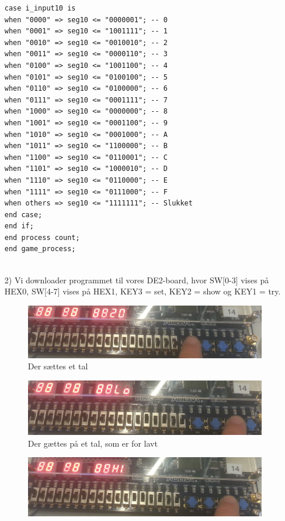 \begin{enumerate}
\begin{lstlisting}[caption={Behavioral style kode for Guessgame},label={lst:Guessgame}]
case i_input10 is
when "0000" => seg10 <= "0000001"; -- 0
when "0001" => seg10 <= "1001111"; -- 1
when "0010" => seg10 <= "0010010"; -- 2
when "0011" => seg10 <= "0000110"; -- 3
when "0100" => seg10 <= "1001100"; -- 4
when "0101" => seg10 <= "0100100"; -- 5
when "0110" => seg10 <= "0100000"; -- 6
when "0111" => seg10 <= "0001111"; -- 7
when "1000" => seg10 <= "0000000"; -- 8
when "1001" => seg10 <= "0001100"; -- 9
when "1010" => seg10 <= "0001000"; -- A
when "1011" => seg10 <= "1100000"; -- B
when "1100" => seg10 <= "0110001"; -- C
when "1101" => seg10 <= "1000010"; -- D
when "1110" => seg10 <= "0110000"; -- E
when "1111" => seg10 <= "0111000"; -- F
when others => seg10 <= "1111111"; -- Slukket
end case;
end if;
end process count;
end game_process;


	\end{lstlisting}
	\item[2)]
	Vi downloader programmet til vores DE2-board, hvor SW[0-3] vises på HEX0, SW[4-7] vises på HEX1, KEY3 = set, KEY2 = show og KEY1 = try. \\
	\begin{figure}[h]
		\centering
		\includegraphics[scale=0.15]{pictures/Oevelse5/opg3/guess_set.JPG}
		\caption{Der sættes et tal}
		\label{fig:GuessSet}
	\end{figure}
	\begin{figure}[h]
		\centering
		\includegraphics[scale=0.15]{pictures/Oevelse5/opg3/guess_try_lo.JPG}
		\caption{Der gættes på et tal, som er for lavt}
		\label{fig:GuessTryLo}
	\end{figure}
	\begin{figure}[h]
		\centering
		\includegraphics[scale=0.15]{pictures/Oevelse5/opg3/guess_try_hi.JPG}

\end{figure}
\end{enumerate}
